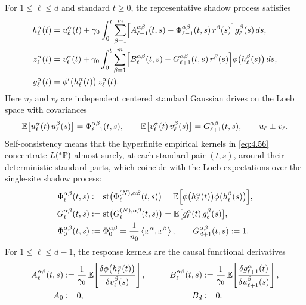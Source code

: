For $1 \le \ell \le d$ and standard $t \ge 0$, the representative shadow process satisfies
\begin{align}
h_\ell^\alpha(t) &= u_\ell^\alpha(t) + \gamma_0 \int_0^t \sum_{\beta=1}^m \Bigl[A_{\ell-1}^{\alpha\beta}(t, s) - \Phi_{\ell-1}^{\alpha\beta}(t, s)\,r^\beta(s)\Bigr] g_\ell^\beta(s)\,ds, \label{eq:4.57} \\
z_\ell^\alpha(t) &= v_\ell^\alpha(t) + \gamma_0 \int_0^t \sum_{\beta=1}^m \Bigl[B_\ell^{\alpha\beta}(t, s) - G_{\ell+1}^{\alpha\beta}(t, s)\,r^\beta(s)\Bigr] \phi\bigl(h_\ell^\beta(s)\bigr)\,ds, \label{eq:4.58} \\
g_\ell^\alpha(t) &= \phi'\bigl(h_\ell^\alpha(t)\bigr)\,z_\ell^\alpha(t). \label{eq:4.59}
\end{align}
Here $u_\ell$ and $v_\ell$ are independent centered standard Gaussian drives on the Loeb space with covariances
\begin{equation}\label{eq:4.60}
\mathbb{E}\bigl[u_\ell^\alpha(t)\,u_\ell^\beta(s)\bigr] = \Phi_{\ell-1}^{\alpha\beta}(t, s), \qquad \mathbb{E}\bigl[v_\ell^\alpha(t)\,v_\ell^\beta(s)\bigr] = G_{\ell+1}^{\alpha\beta}(t, s), \qquad u_\ell \perp v_\ell.
\end{equation}
Self-consistency means that the hyperfinite empirical kernels in \eqref{eq:4.56} concentrate $L({}^*\mathbb{P})$-almost surely, at each standard pair $(t, s)$, around their deterministic standard parts, which coincide with the Loeb expectations over the single-site shadow process:
\begin{equation}\label{eq:4.61}
\begin{aligned}
\Phi_\ell^{\alpha\beta}(t, s) &:= \operatorname{st}\bigl(\Phi_\ell^{(N),\alpha\beta}(t, s)\bigr) = \mathbb{E}\Bigl[\phi\bigl(h_\ell^\alpha(t)\bigr)\phi\bigl(h_\ell^\beta(s)\bigr)\Bigr], \\
G_\ell^{\alpha\beta}(t, s) &:= \operatorname{st}\bigl(G_\ell^{(N),\alpha\beta}(t, s)\bigr) = \mathbb{E}\bigl[g_\ell^\alpha(t)\,g_\ell^\beta(s)\bigr], \\
\Phi_0^{\alpha\beta}(t, s) &:= \Phi_0^{\alpha\beta} = \frac{1}{n_0}\left\langle x^\alpha, x^\beta \right\rangle, \qquad G_{d+1}^{\alpha\beta}(t, s) := 1.
\end{aligned}
\end{equation}
For $1 \le \ell \le d - 1$, the response kernels are the causal functional derivatives
\begin{equation}\label{eq:4.62}
\begin{aligned}
A_\ell^{\alpha\beta}(t, s) &:= \frac{1}{\gamma_0}\,\mathbb{E}\!\left[\frac{\delta\phi\bigl(h_\ell^\alpha(t)\bigr)}{\delta v_\ell^\beta(s)}\right], \qquad &B_\ell^{\alpha\beta}(t, s) &:= \frac{1}{\gamma_0}\,\mathbb{E}\!\left[\frac{\delta g_{\ell+1}^\alpha(t)}{\delta u_{\ell+1}^\beta(s)}\right], \\
A_0 &:= 0, \qquad &B_d &:= 0.
\end{aligned}
\end{equation}
